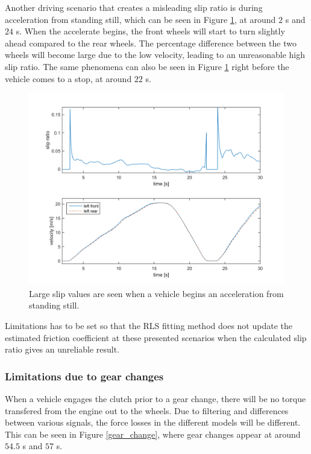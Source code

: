 Another driving scenario that creates a misleading slip ratio is during acceleration from standing still, which can be seen in Figure \ref{slipratio_from_still}, at around $ 2 $ s and $ 24 $ s. When the accelerate begins, the front wheels will start to turn slightly ahead compared to the rear wheels. The percentage difference between the two wheels will become large due to the low velocity, leading to an unreasonable high slip ratio. The same phenomena can also be seen in Figure \ref{slipratio_from_still} right before the vehicle comes to a stop, at around $ 22 $ s. 

\begin{figure}[h]
	\centering
	\includegraphics[width=1.0\textwidth]{Pictures/slipratio_from_still}
	\caption {Large slip values are seen when a vehicle begins an acceleration from standing still.}
	\label{slipratio_from_still}
\end{figure}

Limitations has to be set so that the RLS fitting method does not update the estimated friction coefficient at these presented scenarios when the calculated slip ratio gives an unreliable result.

\subsubsection{Limitations due to gear changes}
\label{sec:gearchange}
When a vehicle engages the clutch prior to a gear change, there will be no torque transfered from the engine out to the wheels. Due to filtering and differences between various signals, the force losses in the different models will be different. This can be seen in Figure \ref{gear_change}, where gear changes appear at around $ 54.5 $ s and $ 57 $ s.

